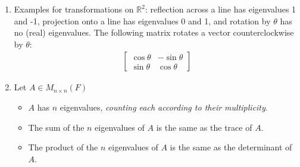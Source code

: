 \documentclass[10pt]{article}
\begin{document}
\begin{multicols*}{2}
\begin{enumerate}
\begin{enumerate}
        \item Examples for transformations on $\mathbb{R}^2$: reflection across a line has eigenvalues 1 and -1, projection onto a line has eigenvalues 0 and 1, and rotation by $\theta$ has no (real) eigenvalues. The following matrix rotates a vector counterclockwise by $\theta$:
        \begin{align*}
            \begin{bmatrix}
            \cos{\theta} & -\sin{\theta} \\
            \sin{\theta} & \cos{\theta}
            \end{bmatrix}
        \end{align*}
         
        \item Let $A \in M_{n \times n}(F)$
        \begin{itemize}
            \item $A$ has $n$ eigenvalues, \textit{counting each according to their multiplicity}.
            \item The sum of the $n$ eigenvalues of $A$ is the same as the trace of $A$.
            \item The product of the $n$ eigenvalues of $A$ is the same as the determinant of $A$.
        \end{itemize}
    \end{enumerate}
    

\end{enumerate}
\end{multicols*}
\end{document}

